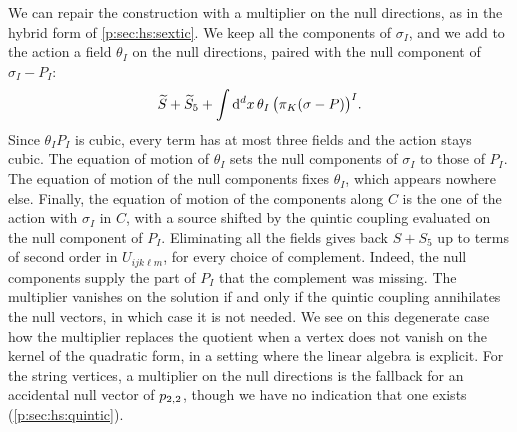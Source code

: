 We can repair the construction with a multiplier on the null directions, as in the hybrid form of \cref{p:sec:hs:sextic}.
  We keep all the components of $\sigma_I$, and we add to the action a field $\theta_I$ on the null directions, paired with the null component of $\sigma_I - P_I$:
  \begin{equation}
  \label{p:eq:shs:multiplier}
  \caction + \caction[5]
    + \int \dd^d x \, \theta_I \, \big( \pi_K (\sigma - P) \big)^I.
\end{equation}
  Since $\theta_I P_I$ is cubic, every term has at most three fields and the action stays cubic.
  The equation of motion of $\theta_I$ sets the null components of $\sigma_I$ to those of $P_I$.
  The equation of motion of the null components fixes $\theta_I$, which appears nowhere else.
  Finally, the equation of motion of the components along $C$ is the one of the action with $\sigma_I$ in $C$, with a source shifted by the quintic coupling evaluated on the null component of $P_I$.
  Eliminating all the fields gives back $S + S_5$ up to terms of second order in $U_{ijk\ell m}$, for every choice of complement.
  Indeed, the null components supply the part of $P_I$ that the complement was missing.
  The multiplier vanishes on the solution if and only if the quintic coupling annihilates the null vectors, in which case it is not needed.
  We see on this degenerate case how the multiplier replaces the quotient when a vertex does not vanish on the kernel of the quadratic form, in a setting where the linear algebra is explicit.
  For the string vertices, a multiplier on the null directions is the fallback for an accidental null vector of $\sprod{2}{2}$, though we have no indication that one exists (\cref{p:sec:hs:quintic}).
